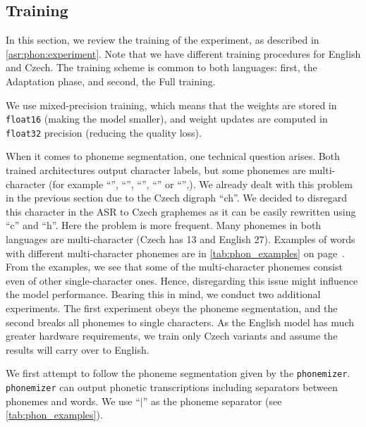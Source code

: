 \subsection{Training}
\label{asr:phon:training}
In this section, we review the training of the experiment, as described in \cref{asr:phon:experiment}. Note that we have different training procedures for English and Czech. The training scheme is common to both languages: first, the Adaptation phase, and second, the Full training.

We use mixed-precision training, which means that the weights are stored in \texttt{float16} (making the model smaller), and weight updates are computed in \texttt{float32} precision (reducing the quality loss).

When it comes to phoneme segmentation, one technical question arises. Both trained architectures output character labels, but some phonemes are multi-character (for example ``'', ``'', ``'', ``'' or ``'',). We already dealt with this problem in the previous section due to the Czech digraph ``ch''. We decided to disregard this character in the ASR to Czech graphemes as it can be easily rewritten using ``c'' and ``h''. Here the problem is more frequent. Many phonemes in both languages are multi-character (Czech has 13 and English 27). Examples of words with different multi-character phonemes are in \cref{tab:phon_examples} on page~\pageref{tab:phon_examples}. From the examples, we see that some of the multi-character phonemes consist even of other single-character ones. Hence, disregarding this issue might influence the model performance. Bearing this in mind, we conduct two additional experiments. The first experiment obeys the phoneme segmentation, and the second breaks all phonemes to single characters. As the English model has much greater hardware requirements, we train only Czech variants and assume the results will carry over to English.

We first attempt to follow the phoneme segmentation given by the \texttt{phonemizer}. \texttt{phonemizer} can output phonetic transcriptions including separators between pho\-ne\-mes and words. We use ``$\mid$'' as the phoneme separator (see \cref{tab:phon_examples}). 


